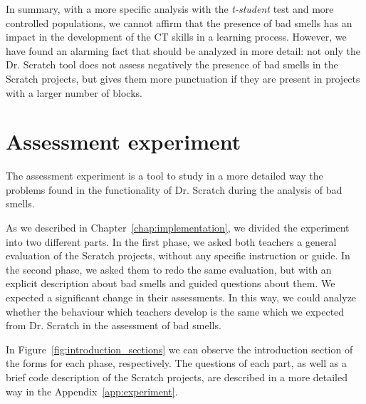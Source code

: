 \hfill

In summary, with a more specific analysis with the \textit{t-student} test and more controlled populations, we cannot affirm that the presence of bad smells has an impact in the development of the CT skills in a learning process. However, we have found an alarming fact that should be analyzed in more detail: not only the Dr. Scratch tool does not assess negatively the presence of bad smells in the Scratch projects, but gives them more punctuation if they are present in projects with a larger number of blocks.

\section{Assessment experiment}
\label{sec:results_experiment}

The assessment experiment is a tool to study in a more detailed way the problems found in the functionality of Dr. Scratch during the analysis of bad smells. 

As we described in Chapter~\ref{chap:implementation}, we divided the experiment into two different parts. In the first phase, we asked both teachers a general evaluation of the Scratch projects, without any specific instruction or guide. In the second phase, we asked them to redo the same evaluation, but with an explicit description about bad smells and guided questions about them. We expected a significant change in their assessments. In this way, we could analyze whether the behaviour which teachers develop is the same which we expected from Dr. Scratch in the assessment of bad smells. 

In Figure~\ref{fig:introduction_sections} we can observe the introduction section of the forms for each phase, respectively.  The questions of each part, as well as a brief code description of the Scratch projects, are described in a more detailed way in the Appendix~\ref{app:experiment}.

